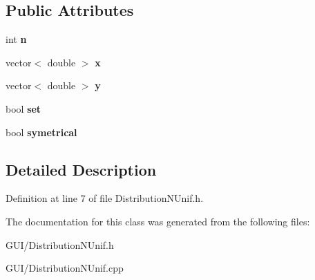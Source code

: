 \subsection*{Public Attributes}
\begin{DoxyCompactItemize}
\item 
\mbox{\label{class_c_distribution_n_unif_aa8888d74432129145ed155465b63926c}} 
int {\bfseries n}
\item 
\mbox{\label{class_c_distribution_n_unif_a77a8b760a26632f6e8e8d540ed26e6e4}} 
vector$<$ double $>$ {\bfseries x}
\item 
\mbox{\label{class_c_distribution_n_unif_afccb9bdf6272400f22c588a7bde0e2ce}} 
vector$<$ double $>$ {\bfseries y}
\item 
\mbox{\label{class_c_distribution_n_unif_abc584adabb01eb5da657728013eff8ec}} 
bool {\bfseries set}
\item 
\mbox{\label{class_c_distribution_n_unif_abfe557f099f34dab96854618c281d49c}} 
bool {\bfseries symetrical}
\end{DoxyCompactItemize}


\subsection{Detailed Description}


Definition at line 7 of file Distribution\+N\+Unif.\+h.



The documentation for this class was generated from the following files\+:\begin{DoxyCompactItemize}
\item 
G\+U\+I/Distribution\+N\+Unif.\+h\item 
G\+U\+I/Distribution\+N\+Unif.\+cpp\end{DoxyCompactItemize}
